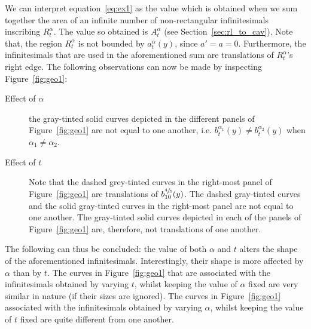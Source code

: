 \documentclass[twoside,reqno,11pt]{fcaa-var} %
\begin{document}
\noindent
We can interpret equation~\eqref{eq:ex1} as the value which is obtained when we sum together the area of an infinite number of non-rectangular infinitesimals inscribing $R_{t}^{\alpha}$. The value so obtained is $A_{t}^{\alpha}$ (see Section~\ref{sec:rl_to_cav}). Note that, the region $R_{t}^{\alpha}$ is not bounded by $a_{t}^{\alpha}(y)$, since $a'=a=0$. Furthermore, the infinitesimals that are used in the aforementioned sum are translations of $R_{t}^{\alpha}$'s right edge. The following observations can now be made by inspecting Figure~\ref{fig:geo1}: 
\begin{description}
 \item[Effect of $\alpha$] the gray-tinted solid curves depicted in the different panels of Figure~\ref{fig:geo1} are not equal to one another, i.e. $b_{t}^{\alpha_1}(y)\neq b_{t}^{\alpha_2}(y)$ when $\alpha_1\neq\alpha_2$. 
 \item[Effect of $t$] Note that the dashed grey-tinted curves in the right-most panel of Figure~\ref{fig:geo1} are translations of $b_{10}^{\sfrac{4}{5}}(y)$. The dashed gray-tinted curves and the solid gray-tinted curves in the right-most panel are not equal to one another. The gray-tinted solid curves depicted in each of the panels of Figure~\ref{fig:geo1} are, therefore, not translations of one another. 
\end{description}
The following can thus be concluded: the value of both $\alpha$ and $t$ alters the shape of the aforementioned infinitesimals. Interestingly, their shape is more affected by $\alpha$ than by $t$. The curves in Figure~\ref{fig:geo1} that are associated with the infinitesimals obtained by varying $t$, whilst keeping the value of $\alpha$ fixed are very similar in nature (if their 
sizes are ignored). The curves in Figure~\ref{fig:geo1} associated with the infinitesimals obtained by varying $\alpha$, whilst keeping the value of $t$ fixed are quite different from one another.\\  

\end{document}
